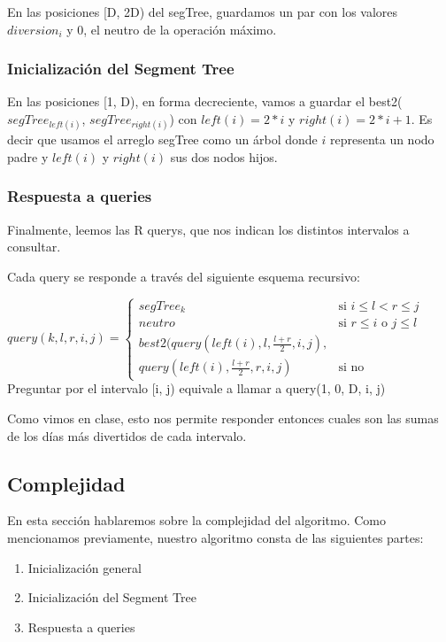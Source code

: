 En las posiciones [D, 2D) del segTree, guardamos un par con los valores \texttt{$diversion_i$} y 0, el neutro de la operaci\'on m\'aximo.

\subsubsection{Inicialización del Segment Tree}
En las posiciones [1, D), en forma decreciente, vamos a guardar el best2($segTree_{left(i)}$, $segTree_{right(i)}$) con $left(i) = 2 * i$ y $right(i) = 2 * i + 1$. Es decir que usamos el arreglo segTree como un \'arbol donde $i$ representa un nodo padre y $left(i)$ y $right(i)$ sus dos nodos hijos.

\subsubsection{Respuesta a queries}
Finalmente, leemos las R querys, que nos indican los distintos intervalos a consultar.

Cada query se responde a trav\'es del siguiente esquema recursivo:

$query(k, l, r, i, j) =
\left\{
	\begin{array}{ll}
		segTree_k  & \mbox{si } i \leq l < r \leq j \\
		neutro & \mbox{si } r \leq i \mbox{ o } j \leq l \\
		best2(query(left(i), l, \frac{l+r}{2}, i, j), \\ query(left(i), \frac{l+r}{2}, r, i, j) & \mbox{si no}
	\end{array}
\right. $ \\

Preguntar por el intervalo [i, j) equivale a llamar a query(1, 0, D, i, j)

Como vimos en clase, esto nos permite responder entonces cuales son las sumas de los días más divertidos de cada intervalo.

\subsection{Complejidad}
En esta secci\'on hablaremos sobre la complejidad del algoritmo. Como mencionamos previamente, nuestro algoritmo consta de las siguientes partes:
\begin{enumerate}
\item Inicialización general
\item Inicialización del Segment Tree
\item Respuesta a queries
\end{enumerate}

